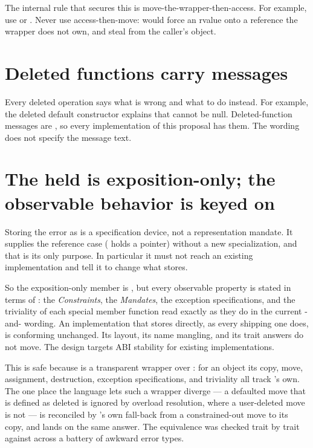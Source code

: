 \documentclass[a4paper,10pt,oneside,openany,final,article]{memoir}
\begin{document}
The internal rule that secures this is move-the-wrapper-then-access. For
example, use  or . Never use
access-then-move:  would force an rvalue onto a reference
the wrapper does not own, and steal from the caller's object.

\section{Deleted functions carry messages}

Every deleted operation says what is wrong and what to do instead. For example,
the deleted default constructor explains that  cannot be null.
Deleted-function messages \cite{P2573R2} are \CppXXVI{}, so every
implementation of this proposal has them. The wording does not specify the
message text.

\section{The held  is exposition-only; the observable
  behavior is keyed on }

Storing the error as  is a specification device, not a
representation mandate. It supplies the reference case ( holds a pointer)
without a new specialization, and
that is its only purpose. In particular it must not reach an existing implementation and tell it to change
what  stores.

So the exposition-only member is , but every observable
property is stated in terms of : the \emph{Constraints}, the
\emph{Mandates}, the exception specifications, and the triviality of each special
member function read exactly as they do in the current -and-
wording. An implementation that stores  directly, as every shipping one
does, is conforming unchanged. Its layout, its name mangling, and its trait
answers do not move. The design targets ABI stability for existing
implementations.

This is safe because  is a transparent wrapper over
: for an object  its copy, move, assignment, destruction,
exception specifications, and triviality all track 's own. The one place
the language lets such a wrapper diverge --- a defaulted move that is defined as
deleted is ignored by overload resolution, where a user-deleted move is not ---
is reconciled by 's own fall-back from a constrained-out move to
its copy, and lands on the same answer. The equivalence was checked trait by
trait against  across a battery of awkward error types.
\end{document}

